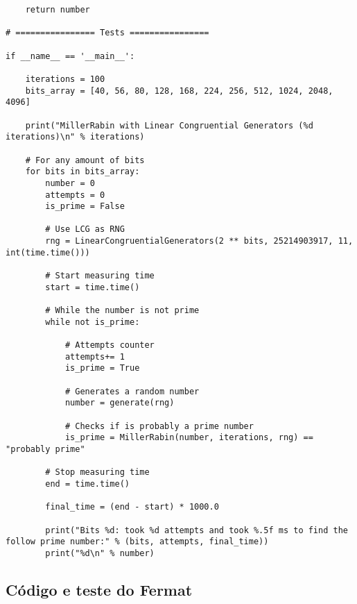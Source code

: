 \documentclass{article}
\begin{document}
\begin{lstlisting}
	return number

# ================ Tests ================

if __name__ == '__main__':

	iterations = 100
	bits_array = [40, 56, 80, 128, 168, 224, 256, 512, 1024, 2048, 4096]

	print("MillerRabin with Linear Congruential Generators (%d iterations)\n" % iterations)

	# For any amount of bits
	for bits in bits_array:
		number = 0
		attempts = 0
		is_prime = False

		# Use LCG as RNG
		rng = LinearCongruentialGenerators(2 ** bits, 25214903917, 11, int(time.time()))

		# Start measuring time
		start = time.time()

		# While the number is not prime
		while not is_prime:

			# Attempts counter
			attempts+= 1
			is_prime = True

			# Generates a random number
			number = generate(rng)

			# Checks if is probably a prime number
			is_prime = MillerRabin(number, iterations, rng) == "probably prime"

		# Stop measuring time
		end = time.time()

		final_time = (end - start) * 1000.0

		print("Bits %d: took %d attempts and took %.5f ms to find the follow prime number:" % (bits, attempts, final_time))
		print("%d\n" % number)
\end{lstlisting}

\pagebreak

\subsection{Código e teste do Fermat}
\label{fermat-full}
\end{document}
